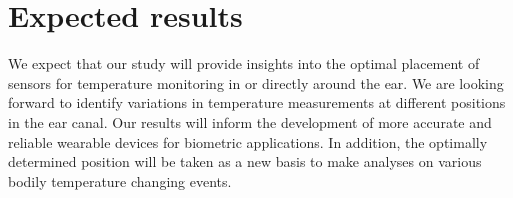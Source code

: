 

\section{Expected results}
We expect that our study will provide insights into the optimal placement of sensors for temperature monitoring in or directly around the ear. We are looking forward to identify variations in temperature measurements at different positions in the ear canal. Our results will inform the development of more accurate and reliable wearable devices for biometric applications. In addition, the optimally determined position will be taken as a new basis to make analyses on various bodily temperature changing events.

